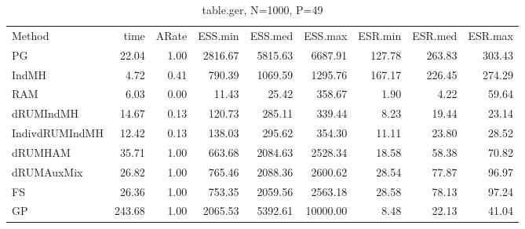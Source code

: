 \begin{table}
\begin{tabular}{l r r r r r r r r } 
          Method  &     time &    ARate &  ESS.min &  ESS.med &  ESS.max &  ESR.min &  ESR.med &  ESR.max \\ 
              PG  &    22.04 &     1.00 &  2816.67 &  5815.63 &  6687.91 &   127.78 &   263.83 &   303.43 \\ 
           IndMH  &     4.72 &     0.41 &   790.39 &  1069.59 &  1295.76 &   167.17 &   226.45 &   274.29 \\ 
             RAM  &     6.03 &     0.00 &    11.43 &    25.42 &   358.67 &     1.90 &     4.22 &    59.64 \\ 
       dRUMIndMH  &    14.67 &     0.13 &   120.73 &   285.11 &   339.44 &     8.23 &    19.44 &    23.14 \\ 
  IndivdRUMIndMH  &    12.42 &     0.13 &   138.03 &   295.62 &   354.30 &    11.11 &    23.80 &    28.52 \\ 
         dRUMHAM  &    35.71 &     1.00 &   663.68 &  2084.63 &  2528.34 &    18.58 &    58.38 &    70.82 \\ 
      dRUMAuxMix  &    26.82 &     1.00 &   765.46 &  2088.36 &  2600.62 &    28.54 &    77.87 &    96.97 \\ 
              FS  &    26.36 &     1.00 &   753.35 &  2059.56 &  2563.18 &    28.58 &    78.13 &    97.24 \\ 
              GP  &   243.68 &     1.00 &  2065.53 &  5392.61 & 10000.00 &     8.48 &    22.13 &    41.04
 \end{tabular}
\caption{table.ger, N=1000, P=49}
\end{table}

